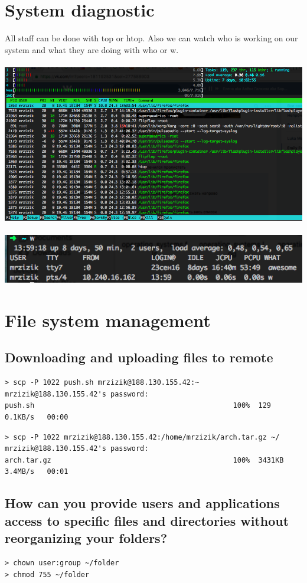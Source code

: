 \documentclass[10pt]{article}
\begin{document}
\section{System diagnostic}
All staff can be done with top or htop. Also we can watch who is working on our system and what they are doing with who or w. \\ \\
\includegraphics[width=\textwidth, scale=0.5]{htop}\\ \\
\includegraphics[width=\textwidth, scale=0.5]{w}


\section{File system management}
\subsection{Downloading and uploading files to remote}
\begin{verbatim}
> scp -P 1022 push.sh mrzizik@188.130.155.42:~
mrzizik@188.130.155.42's password:
push.sh                                               100%  129     0.1KB/s   00:00
\end{verbatim}
\begin{verbatim}
> scp -P 1022 mrzizik@188.130.155.42:/home/mrzizik/arch.tar.gz ~/
mrzizik@188.130.155.42's password: 
arch.tar.gz                                           100%  3431KB     3.4MB/s   00:01
\end{verbatim}
\subsection{How can you provide users and applications access to specific files and directories without reorganizing your folders?}
\begin{verbatim}
> chown user:group ~/folder
> chmod 755 ~/folder
\end{verbatim}
\end{document}
